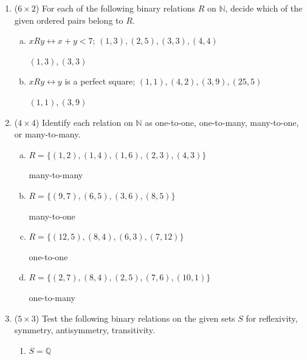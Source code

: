 \documentclass[12pt]{article}
\newcommand{\ro}{R}
\begin{document}
	\begin{enumerate}
				\item ($6 \times 2$)
				For each of the following binary relations $\ro$ on $\mathbb{N}$, decide which of the given ordered pairs belong to $\ro$.
				\begin{enumerate}[a.]
					\item
					$x \ro y \leftrightarrow x + y < 7$; $\left(1, 3\right), \left(2, 5\right), \left(3, 3\right), \left(4, 4\right)$

					$(1,3), (3,3)$

					\item
					$x \ro y \leftrightarrow y$ is a perfect square; $\left(1, 1\right), \left(4, 2\right), \left(3, 9\right), \left(25, 5\right)$

					$(1,1), (3,9)$
				\end{enumerate}


				\newpage
				\item ($4 \times 4$)
				Identify each relation on $\mathbb{N}$ as one-to-one, one-to-many, many-to-one, or many-to-many.
				\begin{enumerate}[a.]
					\item
					$\ro = \{\left(1, 2\right), \left(1, 4\right), \left(1, 6\right), \left(2, 3\right), \left(4, 3\right)\}$

					many-to-many

					\item
					$\ro = \{\left(9, 7\right), \left(6, 5\right), \left(3, 6\right), \left(8, 5\right)\}$

					many-to-one

					\item
					$\ro = \{\left(12, 5\right), \left(8, 4\right), \left(6, 3\right), \left(7, 12\right)\}$

					one-to-one

					\item
					$\ro = \{\left(2, 7\right), \left(8, 4\right), \left(2, 5\right), \left(7, 6\right), \left(10, 1\right)\}$

					one-to-many
				\end{enumerate}


				\newpage
				\item ($5 \times 3$)
					Test the following binary relations on the given sets $S$ for reflexivity, symmetry, antisymmetry, transitivity.
					\begin{enumerate}
						\item
						$S = \mathbb{Q}$


\end{enumerate}
\end{enumerate}
\end{document}
